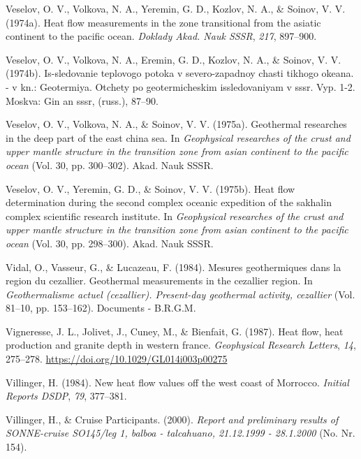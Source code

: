 \begin{CSLReferences}{1}{1}
\leavevmode{}%
Veselov, O. V., Volkova, N. A., Yeremin, G. D., Kozlov, N. A., \& Soinov, V. V. (1974a). Heat flow measurements in the zone transitional from the asiatic continent to the pacific ocean. \emph{Doklady Akad. Nauk SSSR}, \emph{217}, 897--900.

\leavevmode{}%
Veselov, O. V., Volkova, N. A., Eremin, G. D., Kozlov, N. A., \& Soinov, V. V. (1974b). Is-sledovanie teplovogo potoka v severo-zapadnoy chasti tikhogo okeana. - v kn.: Geotermiya. Otchety po geotermicheskim issledovaniyam v sssr. Vyp. 1-2. Moskva: Gin an sssr, (russ.), 87--90.

\leavevmode{}%
Veselov, O. V., Volkova, N. A., \& Soinov, V. V. (1975a). Geothermal researches in the deep part of the east china sea. In \emph{Geophysical researches of the crust and upper mantle structure in the transition zone from asian continent to the pacific ocean} (Vol. 30, pp. 300--302). Akad. Nauk SSSR.

\leavevmode{}%
Veselov, O. V., Yeremin, G. D., \& Soinov, V. V. (1975b). Heat flow determination during the second complex oceanic expedition of the sakhalin complex scientific research institute. In \emph{Geophysical researches of the crust and upper mantle structure in the transition zone from asian continent to the pacific ocean} (Vol. 30, pp. 298--300). Akad. Nauk SSSR.

\leavevmode{}%
Vidal, O., Vasseur, G., \& Lucazeau, F. (1984). Mesures geothermiques dans la region du cezallier. Geothermal measurements in the cezallier region. In \emph{Geothermalisme actuel (cezallier). Present-day geothermal activity, cezallier} (Vol. 81--10, pp. 153--162). Documents - B.R.G.M.

\leavevmode{}%
Vigneresse, J. L., Jolivet, J., Cuney, M., \& Bienfait, G. (1987). Heat flow, heat production and granite depth in western france. \emph{Geophysical Research Letters}, \emph{14}, 275--278. \url{https://doi.org/10.1029/GL014i003p00275}

\leavevmode{}%
Villinger, H. (1984). New heat flow values off the west coast of {Morrocco}. \emph{Initial Reports DSDP}, \emph{79}, 377--381.

\leavevmode{}%
Villinger, H., \& Cruise Participants. (2000). \emph{Report and preliminary results of SONNE-cruise SO145/leg 1, balboa - talcahuano, 21.12.1999 - 28.1.2000} (No. Nr. 154).


\end{CSLReferences}
